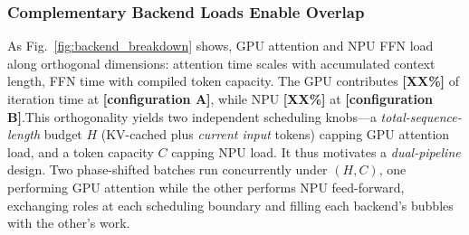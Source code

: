 \documentclass[sigconf,nonacm,10pt]{acmart}
\begin{document}
\subsubsection{Complementary Backend Loads Enable Overlap} \label{sec:oppo_pipeline}
As Fig.~\ref{fig:backend_breakdown} shows, GPU attention and NPU FFN load along orthogonal dimensions: attention time scales with accumulated context length, FFN time with compiled token capacity. The GPU contributes {\color{red}\textbf{[XX\%]}} of iteration time at {\color{red}\textbf{[configuration A]}}, while NPU {\color{red}\textbf{[XX\%]}} at {\color{red}\textbf{[configuration B]}}.This orthogonality yields two independent scheduling knobs---a \emph{total-sequence-length} budget $H$ (KV-cached plus \emph{current input} tokens) capping GPU attention load, and a token capacity $C$ capping NPU load. It thus motivates a \emph{dual-pipeline} design. Two phase-shifted batches run concurrently under $(H,C)$, one performing GPU attention while the other performs NPU feed-forward, exchanging roles at each scheduling boundary and filling each backend's bubbles with the other's work.

\end{document}
